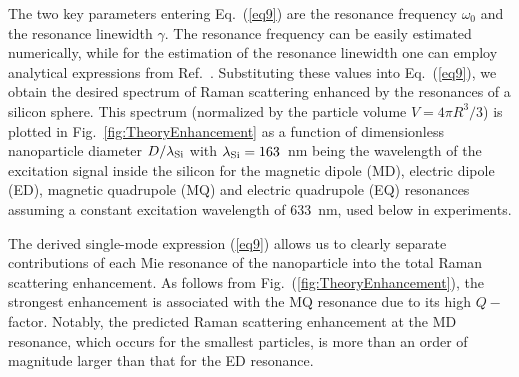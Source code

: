         The two key parameters entering Eq.~(\ref{eq9}) are the resonance frequency $\omega_0$ and the resonance linewidth $\gamma$.
        The resonance frequency can be easily estimated numerically, while for the estimation of the resonance linewidth one can
        employ analytical expressions from Ref.~\cite{lai1991effect}. Substituting these values into Eq.~(\ref{eq9}), we obtain the desired
        spectrum of Raman scattering enhanced by the resonances of a silicon sphere. This spectrum (normalized by the particle
        volume $V=4\pi R^3/3$) is plotted in Fig.~\ref{fig:TheoryEnhancement} as a  function of dimensionless nanoparticle diameter $D/\lambda_{\rm Si}$
        with $\lambda_{\rm Si}=163$~nm being the wavelength of the excitation signal inside the silicon for the magnetic dipole (MD), electric dipole (ED),
        magnetic quadrupole (MQ) and electric quadrupole (EQ) resonances assuming a constant excitation wavelength of 633~nm,
        used below in experiments.

        The derived single-mode expression (\ref{eq9}) allows us to clearly separate contributions of each Mie resonance of the
        nanoparticle into the total Raman scattering enhancement. As follows from Fig.~(\ref{fig:TheoryEnhancement}), the strongest enhancement
        is associated with the MQ resonance due to its high $Q-$factor. Notably, the predicted Raman scattering enhancement
        at the MD resonance, which occurs for the smallest particles, is more than an order of magnitude larger than that for
        the ED resonance.
